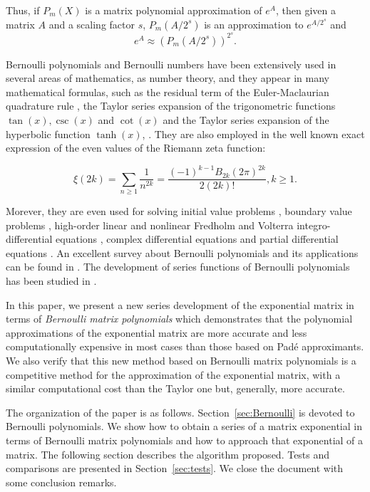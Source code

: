\documentclass[preprint,10pt,numbers,sort&compress]{elsarticle}
\begin{document}
Thus, if ${P_m}(X)$ is a matrix polynomial  approximation of $e^A$, then given a matrix $A$ and a scaling factor $s$,   $P_m(A/2^s)$ is an approximation to $e^{A/2^s}$ and
\begin{equation}
\label{Eq_scaling}
e^{A}\approx \left(P_m(A/2^s) \right)^{2^s}.
\end{equation}

Bernoulli polynomials and Bernoulli numbers have been extensively used in several areas of mathematics, as number theory, and they appear in many mathematical formulas, such as the residual term of the Euler-Maclaurian quadrature rule \cite[p. 63]{olver2010nist}, the Taylor series expansion of the trigonometric functions $\tan{(x)}, \csc{(x)}$ and $\cot{(x)}$ \cite[p. 116-117]{olver2010nist} and the Taylor series expansion of the hyperbolic function $\tanh{(x)}$,  \cite[p. 125]{olver2010nist}. They are also employed in the well known exact expression  of the  even values of the Riemann zeta function:

$$
\xi(2k)=\sum_{n \geq 1} \frac{1}{n^{2k}}=\frac{(-1)^{k-1}B_{2k}(2\pi)^{2k}}{2(2k)!} , k \geq 1.
$$

Morever, they are even used for solving initial value problems \cite{tohidi2013new}, boundary value problems \cite{islam2013numerical,tohidi2013collocation}, high-order linear and nonlinear Fredholm and Volterra integro-differential equations \cite{bhrawy2012new,tohidi2014numerical}, complex differential equations \cite{toutounian2013collocation} and partial differential equations \cite{tohidi2014convergence,tohidi2016new, toutounian2013new}. An excellent survey about Bernoulli polynomials and its applications can be found in  \cite{kouba2013lecture}. The development of series functions of Bernoulli polynomials has been studied in \cite{costabile2001expansion,costabile2001expansions}.

In this paper, we present a new series development of the exponential matrix in terms of \emph{Bernoulli matrix polynomials} which demonstrates that
the polynomial approximations of the exponential matrix are more accurate and less computationally expensive in most cases than those based on Pad\'{e} approximants. 
We also verify that this new method based on Bernoulli matrix polynomials is a competitive method for the
approximation of the exponential matrix, with a similar computational cost than the Taylor one but, generally, more accurate. 


The organization of the paper is as follows. Section~\ref{sec:Bernoulli} is devoted to Bernoulli polynomials. 
We show how to obtain a series of a matrix exponential in terms of Bernoulli matrix polynomials and how to approach that exponential of a matrix. 
The following section describes the algorithm proposed. 
Tests and comparisons are presented in Section~\ref{sec:tests}. 
We close the document with some conclusion remarks.
\end{document}
